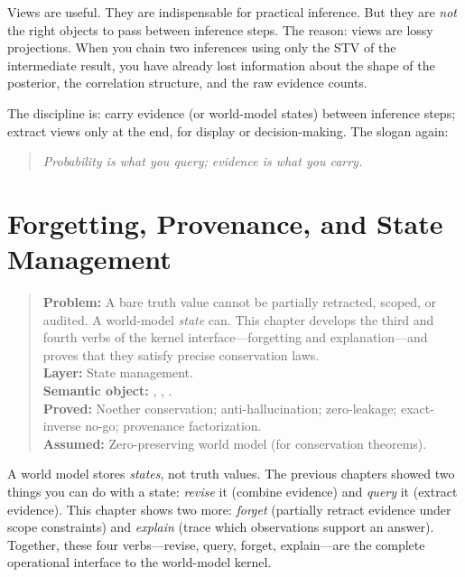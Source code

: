 \documentclass[11pt,openany]{report}
\begin{document}
Views are useful.  They are indispensable for practical inference.  But
they are \emph{not} the right objects to pass between inference steps.
The reason: views are lossy projections.  When you chain two inferences
using only the STV of the intermediate result, you have already lost
information about the shape of the posterior, the correlation structure,
and the raw evidence counts.

The \xiPLN{} discipline is: carry evidence (or world-model states)
between inference steps; extract views only at the end, for display
or decision-making.  The slogan again:

\begin{quote}
\emph{Probability is what you query; evidence is what you carry.}
\end{quote}


\chapter{Forgetting, Provenance, and State Management}
\label{ch:forgetting-provenance}

\begin{quote}\small
\textbf{Problem:} A bare truth value cannot be partially retracted,
scoped, or audited.  A world-model \emph{state} can.  This chapter
develops the third and fourth verbs of the kernel interface---forgetting
and explanation---and proves that they satisfy precise conservation laws.\\[4pt]
\textbf{Layer:} State management.\\
\textbf{Semantic object:} , , .\\
\textbf{Proved:} Noether conservation; anti-hallucination; zero-leakage; exact-inverse no-go; provenance factorization.\\
\textbf{Assumed:} Zero-preserving world model (for conservation theorems).
\end{quote}

A world model stores \emph{states}, not truth values.  The previous
chapters showed two things you can do with a state: \emph{revise} it
(combine evidence) and \emph{query} it (extract evidence).  This chapter
shows two more: \emph{forget} (partially retract evidence under scope
constraints) and \emph{explain} (trace which observations support an
answer).  Together, these four verbs---revise, query, forget,
explain---are the complete operational interface to the world-model
kernel.
\end{document}
